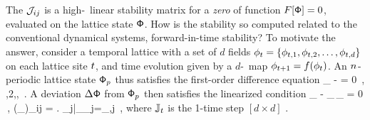 The {\jacobianOrb} ${\mathcal{J}}_{ij}$  is a high-\dmn\
linear stability matrix for a {\em zero} of function $F[\mathsf{\Phi}]=0$,
evaluated on the lattice state $\mathsf{\Phi}$. How is the stability so
computed related to the conventional dynamical systems, forward-in-time
stability? To motivate the answer, consider a temporal lattice with a set
of $d$ fields
$\phi_{t}=\{\phi_{t,1},\phi_{t,2},\dots,\phi_{t,d}\}$ on
each lattice site $t$, and time evolution given by a $d$-\dmn\ map
$\phi_{t+1}=f(\phi_{t})$.
An ${n_{}}$-periodic lattice state $\mathsf{\Phi}_p$  thus
satisfies the first-order difference equation
\beq
\ssp_{\zeit} -  = 0
    \,,\quad
{},2,\cdots,\cl{}
\,.
A deviation $\Delta\mathsf{\Phi}$ from $\mathsf{\Phi}_p$ then satisfies the linearized condition
\beq
\Delta\ssp_{\zeit} - \jMat_{}\,\Delta\ssp_{} = 0
\,,\qquad
(\jMat_{\zeit})_{ij}
=
\left.
           {\partial \ssp_{j}}\right|_{\ssp_{j}=\ssp_{\zeit,j}}
\,,
where $\mathbb{J}_{t}$ is the 1-time step $[d\!\times\!{d}]$
\jacobianM.

